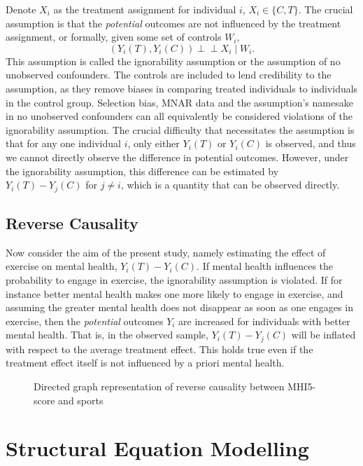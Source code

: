 Denote $X_i$ as the treatment assignment for individual $i$, $X_i \in \{C, T\}$. The crucial assumption is that the
\textit{potential} outcomes are not influenced by the treatment assignment, or formally, given some set of controls
$W_i$,
\begin{equation}
    (Y_i(T), Y_i(C)) \perp\!\!\!\perp X_i \mid W_i.
\end{equation}
This assumption is called the ignorability assumption or the assumption of no unobserved confounders.
The controls are included to lend credibility to the assumption, as they remove biases in comparing treated individuals
to individuals in the control group.
Selection bias, MNAR data and the assumption's namesake in no unobserved confounders can all equivalently be considered
violations of the ignorability assumption.
The crucial difficulty that necessitates the assumption is that for any one individual $i$,
only either $Y_i(T)$ or $Y_i(C)$ is observed, and thus we cannot directly observe the difference in potential outcomes.
However, under the ignorability assumption, this difference can be estimated by $Y_i(T) - Y_j(C)$ for $j \neq i$,
which is a quantity that can be observed directly.

\subsection{Reverse Causality}
Now consider the aim of the present study, namely estimating the effect of exercise on mental health, $Y_i(T) - Y_i(C)$.
If mental health influences the probability to engage in exercise, the ignorability assumption is violated.
If for instance better mental health makes one more likely to engage in exercise, and assuming the greater mental health
does not disappear as soon as one engages in exercise, then the \textit{potential} outcomes $Y_i$ are increased
for individuals with better mental health. That is, in the observed sample, $Y_i(T) - Y_j(C)$ will be inflated with respect to
the average treatment effect.
This holds true even if the treatment effect itself is not influenced by a priori mental health.

\begin{figure}[htbp]
    \centering
    \caption{Directed graph representation of reverse causality between MHI5-score and sports}
    \label{fig:methods:reverse_causality_crosssectional}
\end{figure}

\section{Structural Equation Modelling}
\label{sec:methods:sem}
